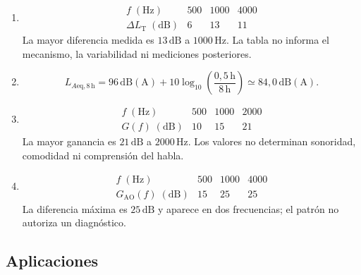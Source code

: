 \begin{enumerate}[label=\textbf{NA\arabic*.},leftmargin=*]
    \item
    \[
    \begin{array}{c|ccc}
        f\;(\mathrm{Hz}) & 500 & 1000 & 4000 \\ \hline
        \Delta L_{\mathrm{T}}\;(\mathrm{dB}) & 6 & 13 & 11
    \end{array}
    \]
    La mayor diferencia medida es \(13\,\mathrm{dB}\) a
    \(1000\,\mathrm{Hz}\). La tabla no informa el mecanismo, la variabilidad
    ni mediciones posteriores.

    \item
    \[
        L_{A\mathrm{eq},8\,\mathrm{h}}
        =
        96\,\mathrm{dB(A)}
        +10\log_{10}\left(\frac{0{,}5\,\mathrm{h}}
        {8\,\mathrm{h}}\right)
        \simeq 84{,}0\,\mathrm{dB(A)}.
    \]

    \item
    \[
    \begin{array}{c|ccc}
        f\;(\mathrm{Hz}) & 500 & 1000 & 2000 \\ \hline
        G(f)\;(\mathrm{dB}) & 10 & 15 & 21
    \end{array}
    \]
    La mayor ganancia es \(21\,\mathrm{dB}\) a \(2000\,\mathrm{Hz}\). Los
    valores no determinan sonoridad, comodidad ni comprensión del habla.

    \item
    \[
    \begin{array}{c|ccc}
        f\;(\mathrm{Hz}) & 500 & 1000 & 4000 \\ \hline
        G_{\mathrm{AO}}(f)\;(\mathrm{dB}) & 15 & 25 & 25
    \end{array}
    \]
    La diferencia máxima es \(25\,\mathrm{dB}\) y aparece en dos frecuencias;
    el patrón no autoriza un diagnóstico.
\end{enumerate}

\subsection*{Aplicaciones}

